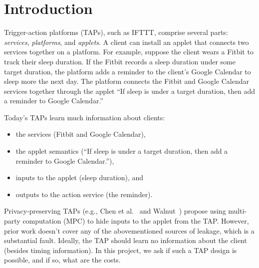 \section{Introduction}
\label{sec:intro}

Trigger-action platforms (TAPs), such as IFTTT, comprise several parts:
\emph{services}, \emph{platforms}, and \emph{applets}. A client can install an
applet that connects two services together on a platform. For example, suppose
the client wears a Fitbit to track their sleep duration. If the Fitbit records a
sleep duration under some target duration, the platform adds a reminder to
the client's Google Calendar to sleep more the next day. The platform connects
the Fitbit and Google Calendar services together through the applet ``If sleep
is under a target duration, then add a reminder to Google Calendar.'' 

Today's TAPs learn much information about clients:
\begin{itemize}[leftmargin=*]
  \item the services (Fitbit and Google Calendar),
  \item the applet semantics (``If sleep is under a target duration, then add a
    reminder to Google Calendar.''),
  \item inputs to the applet (sleep duration), and
  \item outputs to the action service (the reminder).
\end{itemize}

Privacy-preserving TAPs (e.g., Chen et al.~\cite{DBLP:conf/sp/ChenCWSCF21} and
Walnut~\cite{DBLP:journals/corr/abs-2009-12447}) propose using multi-party
computation (MPC) to hide inputs to the applet from the TAP. However, prior work
doesn't cover any of the abovementioned sources of leakage, which is a substantial fault. Ideally,
the TAP should learn no information about the client (besides timing
information). In this project, we ask if such a TAP design is possible, and if
so, what are the costs. 
